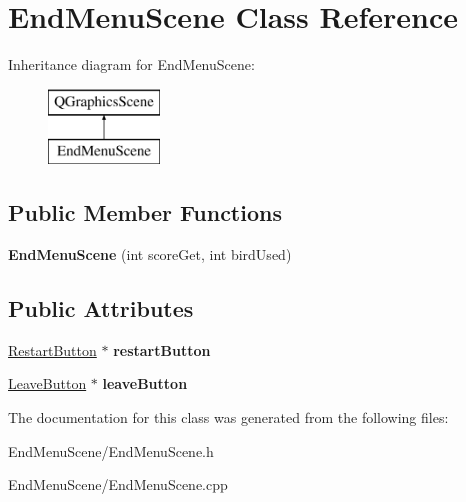 \hypertarget{classEndMenuScene}{}\section{End\+Menu\+Scene Class Reference}
\label{classEndMenuScene}
Inheritance diagram for End\+Menu\+Scene\+:\begin{figure}[H]
\begin{center}
\leavevmode
\includegraphics[height=2.000000cm]{classEndMenuScene}
\end{center}
\end{figure}
\subsection*{Public Member Functions}
\begin{DoxyCompactItemize}
\item 
{\bfseries End\+Menu\+Scene} (int score\+Get, int bird\+Used)\hypertarget{classEndMenuScene_a7bf73b3aaae82ec329c8df40b24d7d67}{}\label{classEndMenuScene_a7bf73b3aaae82ec329c8df40b24d7d67}

\end{DoxyCompactItemize}
\subsection*{Public Attributes}
\begin{DoxyCompactItemize}
\item 
\hyperlink{classRestartButton}{Restart\+Button} $\ast$ {\bfseries restart\+Button}\hypertarget{classEndMenuScene_aea4d6d6dd681933abb1703bbfe5f5636}{}\label{classEndMenuScene_aea4d6d6dd681933abb1703bbfe5f5636}

\item 
\hyperlink{classLeaveButton}{Leave\+Button} $\ast$ {\bfseries leave\+Button}\hypertarget{classEndMenuScene_a74b08243d8f76debf3feab9aff82c6fd}{}\label{classEndMenuScene_a74b08243d8f76debf3feab9aff82c6fd}

\end{DoxyCompactItemize}


The documentation for this class was generated from the following files\+:\begin{DoxyCompactItemize}
\item 
End\+Menu\+Scene/End\+Menu\+Scene.\+h\item 
End\+Menu\+Scene/End\+Menu\+Scene.\+cpp\end{DoxyCompactItemize}
